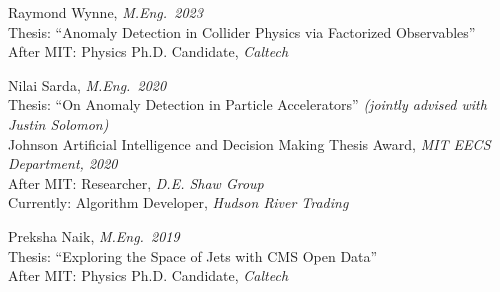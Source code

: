 \bbl

\item Raymond Wynne, \emph{M.Eng.~2023}
\\ Thesis: ``Anomaly Detection in Collider Physics via Factorized Observables''
\\ After MIT: Physics Ph.D. Candidate, \emph{Caltech}

\item Nilai Sarda, \emph{M.Eng.~2020}
\\ Thesis: ``On Anomaly Detection in Particle Accelerators'' \emph{(jointly advised with Justin Solomon)}
\\ Johnson Artificial Intelligence and Decision Making Thesis Award, \emph{MIT EECS Department, 2020}
\\ After MIT: Researcher, \emph{D.E. Shaw Group}
\\ Currently: Algorithm Developer, \emph{Hudson River Trading}

\item Preksha Naik, \emph{M.Eng.~2019}
\\ Thesis: ``Exploring the Space of Jets with CMS Open Data''
\\ After MIT: Physics Ph.D. Candidate, \emph{Caltech}

\el

